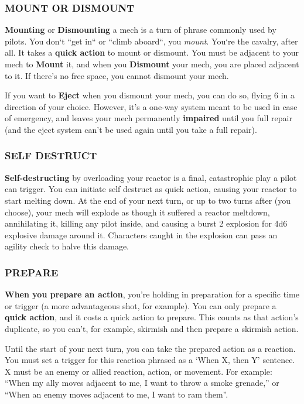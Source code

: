 \subsubsection{MOUNT OR DISMOUNT }
\textbf{Mounting} or \textbf{Dismounting} a mech is a turn of phrase commonly used by pilots. You don‘t “get in“ or “climb aboard“, you \textit{mount}. You‘re the cavalry, after all. It takes a \textbf{quick action} to mount or dismount. You must be adjacent to your mech to \textbf{Mount} it, and when you \textbf{Dismount} your mech, you are placed adjacent to it. If there’s no free space, you cannot dismount your mech.

If you want to \textbf{Eject} when you dismount your mech, you can do so, flying 6 in a direction of your choice. However, it’s a one-way system meant to be used in case of emergency, and leaves your mech permanently \textbf{impaired} until you full repair (and the eject system can’t be used again until you take a full repair).


\subsubsection{SELF DESTRUCT}
\textbf{Self-destructing} by overloading your reactor is a final, catastrophic play a pilot can trigger. You can initiate self destruct as quick action, causing your reactor to start melting down. At the end of your next turn, or up to two turns after (you choose), your mech will explode as though it suffered a reactor meltdown, annihilating it, killing any pilot inside, and causing a burst 2 explosion for 4d6 explosive damage around it. Characters caught in the explosion can pass an agility check to halve this damage.

\subsubsection{PREPARE}
\textbf{When you prepare an action}, you’re holding in preparation for a specific time or trigger (a more advantageous shot, for example). You can only prepare a \textbf{quick action}, and it costs a quick action to prepare. This counts as that action’s duplicate, so you can’t, for example, skirmish and then prepare a skirmish action.

Until the start of your next turn, you can take the prepared action as a reaction. You must set a trigger for this reaction phrased as a ‘When X, then Y’ sentence. X must be an enemy or allied reaction, action, or movement. For example: “When my ally moves adjacent to me, I want to throw a smoke grenade,” or “When an enemy moves adjacent to me, I want to ram them”.

